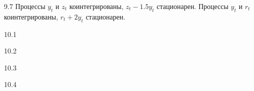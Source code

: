 \protect \hypertarget {soln:9.7}{}
\begin{solution}{{9.7}}
Процессы $y_t$ и $z_t$ коинтегрированы, $z_t - 1.5y_t$ стационарен.
Процессы $y_t$ и $r_t$ коинтегрированы, $r_t + 2y_t$ стационарен.
\end{solution}
\protect \hypertarget {soln:10.1}{}
\begin{solution}{{10.1}}
\end{solution}
\protect \hypertarget {soln:10.2}{}
\begin{solution}{{10.2}}
\end{solution}
\protect \hypertarget {soln:10.3}{}
\begin{solution}{{10.3}}
\end{solution}
\protect \hypertarget {soln:10.4}{}
\begin{solution}{{10.4}}
\end{solution}